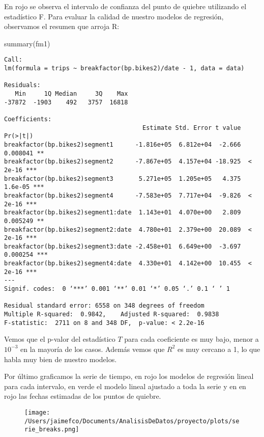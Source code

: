 \documentclass[
]{article}
\newenvironment{Shaded}{}{}
\newcommand{\FunctionTok}[1]{\textcolor[rgb]{0.02,0.16,0.49}{#1}}
\newcommand{\NormalTok}[1]{#1}
\begin{document}
En rojo se observa el intervalo de confianza del punto de quiebre
utilizando el estadístico F. Para evaluar la calidad de nuestro modelos
de regresión, observamos el resumen que arroja R:

\begin{Shaded}
\begin{Highlighting}[]
\FunctionTok{summary}\NormalTok{(fm1)}
\end{Highlighting}
\end{Shaded}

\begin{verbatim}
Call:
lm(formula = trips ~ breakfactor(bp.bikes2)/date - 1, data = data)

Residuals:
   Min     1Q Median     3Q    Max
-37872  -1903    492   3757  16818

Coefficients:
                                      Estimate Std. Error t value Pr(>|t|)
breakfactor(bp.bikes2)segment1      -1.816e+05  6.812e+04  -2.666 0.008041 **
breakfactor(bp.bikes2)segment2      -7.867e+05  4.157e+04 -18.925  < 2e-16 ***
breakfactor(bp.bikes2)segment3       5.271e+05  1.205e+05   4.375  1.6e-05 ***
breakfactor(bp.bikes2)segment4      -7.583e+05  7.717e+04  -9.826  < 2e-16 ***
breakfactor(bp.bikes2)segment1:date  1.143e+01  4.070e+00   2.809 0.005249 **
breakfactor(bp.bikes2)segment2:date  4.780e+01  2.379e+00  20.089  < 2e-16 ***
breakfactor(bp.bikes2)segment3:date -2.458e+01  6.649e+00  -3.697 0.000254 ***
breakfactor(bp.bikes2)segment4:date  4.330e+01  4.142e+00  10.455  < 2e-16 ***
---
Signif. codes:  0 ‘***’ 0.001 ‘**’ 0.01 ‘*’ 0.05 ‘.’ 0.1 ‘ ’ 1

Residual standard error: 6558 on 348 degrees of freedom
Multiple R-squared:  0.9842,	Adjusted R-squared:  0.9838
F-statistic:  2711 on 8 and 348 DF,  p-value: < 2.2e-16
\end{verbatim}

Vemos que el p-valor del estadístico \(T\) para cada coeficiente es muy
bajo, menor a \(10^{-3}\) en la mayoría de los casos. Además vemos que
\(R^2\) es muy cercano a 1, lo que habla muy bien de nuestro modelos.

Por último graficamos la serie de tiempo, en rojo los modelos de
regresión lineal para cada intervalo, en verde el modelo lineal ajustado
a toda la serie y en en rojo las fechas estimadas de los puntos de
quiebre.

\begin{figure}
\centering
\texttt{[image: /Users/jaimefco/Documents/AnalisisDeDatos/proyecto/plots/serie\_breaks.png]}
\caption{}
\end{figure}
\end{document}
